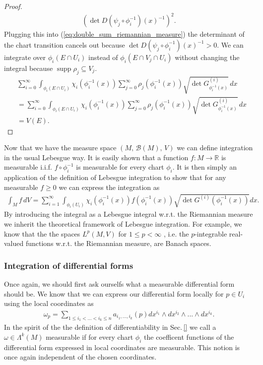 \documentclass[12pt,a4paper]{article}
\numberwithin{equation}{subsection}
\numberwithin{lemma}{subsection}
\theoremstyle{definition}
\DeclareMathOperator{\supp}{supp}
\newcommand{\real}{\mathbb{R}}
\begin{document}
\begin{proof}
\begin{align*}
            \left( \det D(\psi_j \circ \phi_i^{-1})(x)^{-1}\right)^2.
    \end{align*}
    Plugging this into (\ref{eq:double_sum_riemannian_measure}) the determinant 
    of the chart transition cancels out because $\det D(\psi_j \circ \phi_i^{-1})(x)^{-1} > 0$.
    We can integrate over $\phi_i(E \cap U_i)$ 
    instead of $\phi_i(E \cap V_j \cap U_i)$ without changing the integral 
    because $\supp \rho_j \subseteq V_j$.
    \begin{align*}
        &\sum_{i=0}^\infty \int_{\phi_i(E \cap U_i)} \chi_i(\phi_i^{-1}(x))\sum_{j=0}^\infty \rho_j(\phi_i^{-1}(x))
            \sqrt{\det G^{(i)}_{\phi_i^{-1}(x)}} \, dx
        \\ &= \sum_{i=0}^\infty \int_{\phi_i(E \cap U_i)} \chi_i(\phi_i^{-1}(x))
            \sum_{j=0}^\infty \rho_j(\phi_i^{-1}(x)) \sqrt{\det G^{(i)}_{\phi_i^{-1}(x)}} \, dx
        \\ &= V(E).
    \end{align*}
\end{proof}


Now that we have the measure space $(M, \, \mathcal{B}(M), \, V)$
we can define integration in the usual Lebesgue way.
It is easily shown that a function $f: M \rightarrow \real$ is measurable 
i.i.f. $f \circ \phi_i^{-1}$ is measurable for every chart $\phi_i$. 
It is then simply an application of the definition of Lebesgue integration to
show that for any measurable $f \geq 0$ we can express the integration as
\begin{align*}
    \int_M f \, dV = \sum\limits_{i=1}^\infty \int_{\phi_i(U_i)} 
        \chi_i(\phi_i^{-1}(x)) f(\phi_i^{-1}(x)) 
        \sqrt{\det G^{(i)}(\phi_i^{-1}(x))} dx.
\end{align*}
By introducing the integral as a Lebesgue integral w.r.t. the Riemannian 
measure we inherit the theoretical framework of Lebesgue integration. 
For example, we know that the the spaces $L^p(M,V)$ for $1\leq p < \infty$
, i.e. the $p$-integrable 
real-valued functions w.r.t. the Riemannian measure, are Banach spaces.

\subsubsection{Integration of differential forms}\label{sec:integration_differential_forms}

Once again, we should first ask ourselfs what a measurable differential form 
should be. We know that we can express our differential form locally 
for $p \in U_i$ using the local coordinates as 
\begin{align*}
    \omega_p = \sum\limits_{1\leq i_1 < ... < i_k \leq n} 
        a_{i_1,...,i_k}(p) dx^{i_1} \wedge dx^{i_2} \wedge ... \wedge dx^{i_k}.
\end{align*}
In the spirit of the the definition of differentiability 
in Sec.\,\ref{} we call a $\omega \in \Lambda^k (M)$
measurable if for every chart $\phi_i$ the coefficent functions of the 
differential form expressed in local coordinates 
are measurable. This notion is once again independent of the chosen 
coordinates.
\end{document}
